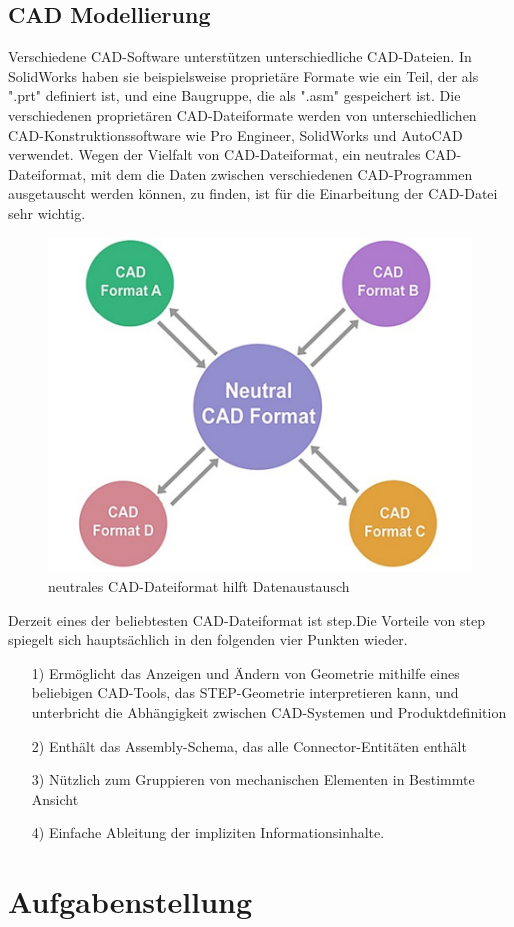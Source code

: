 \documentclass[14pt,a4paper,titlepage]{article}
\begin{document}
	\subsection{CAD Modellierung}
		Verschiedene CAD-Software unterstützen unterschiedliche CAD-Dateien. In SolidWorks haben sie beispielsweise proprietäre Formate wie ein Teil, der als ".prt" definiert ist, und eine Baugruppe, die als ".asm" gespeichert ist. Die verschiedenen proprietären CAD-Dateiformate werden von unterschiedlichen CAD-Konstruktionssoftware wie Pro Engineer, SolidWorks und AutoCAD verwendet. Wegen der Vielfalt von CAD-Dateiformat, ein neutrales CAD-Dateiformat, mit dem die Daten zwischen verschiedenen CAD-Programmen ausgetauscht werden können, zu finden, ist für die Einarbeitung der CAD-Datei sehr wichtig.
		\begin{figure}[h!]
			\centering
			\includegraphics[width=0.5\linewidth]{cad.png}
			\caption{neutrales CAD-Dateiformat hilft Datenaustausch}
			\label{fig7}
		\end{figure}
		\break
		Derzeit eines der beliebtesten CAD-Dateiformat ist \acs{step}.Die Vorteile von \acs{step} spiegelt sich hauptsächlich in den folgenden vier Punkten wieder.
		\begin{itemize}
			\item[1)]
			Ermöglicht das Anzeigen und Ändern von Geometrie mithilfe eines beliebigen CAD-Tools, das STEP-Geometrie interpretieren kann, und unterbricht die Abhängigkeit zwischen CAD-Systemen und Produktdefinition
			\item[2)] 
			Enthält das Assembly-Schema, das alle Connector-Entitäten enthält
			\item[3)] 
			Nützlich zum Gruppieren von mechanischen Elementen in Bestimmte Ansicht
			\item[4)] 
			Einfache Ableitung der impliziten Informationsinhalte. 
		\end{itemize}  
	\pagebreak
	\section{Aufgabenstellung}
\end{document}
